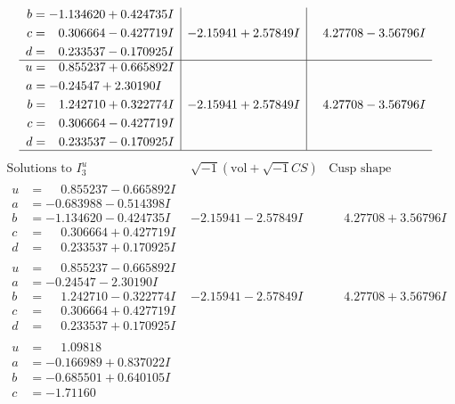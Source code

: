 \documentclass[1p]{elsarticle_modified}
\theoremstyle{definition}
\newcommand{\I}{\sqrt{-1}}
\begin{document}
$$\begin{array}{c|c|c}
\begin{aligned}
b &= -1.134620 + 0.424735 I \\
c &= \phantom{-}0.306664 - 0.427719 I \\
d &= \phantom{-}0.233537 - 0.170925 I\end{aligned}
 & -2.15941 + 2.57849 I & \phantom{-}4.27708 - 3.56796 I \\ \hline\begin{aligned}
u &= \phantom{-}0.855237 + 0.665892 I \\
a &= -0.24547 + 2.30190 I \\
b &= \phantom{-}1.242710 + 0.322774 I \\
c &= \phantom{-}0.306664 - 0.427719 I \\
d &= \phantom{-}0.233537 - 0.170925 I\end{aligned}
 & -2.15941 + 2.57849 I & \phantom{-}4.27708 - 3.56796 I\\
 \hline 
 \end{array}$$\newpage$$\begin{array}{c|c|c}  
\text{Solutions to }I^u_{3}& \I (\text{vol} + \sqrt{-1}CS) & \text{Cusp shape}\\
 \hline 
\begin{aligned}
u &= \phantom{-}0.855237 - 0.665892 I \\
a &= -0.683988 - 0.514398 I \\
b &= -1.134620 - 0.424735 I \\
c &= \phantom{-}0.306664 + 0.427719 I \\
d &= \phantom{-}0.233537 + 0.170925 I\end{aligned}
 & -2.15941 - 2.57849 I & \phantom{-}4.27708 + 3.56796 I \\ \hline\begin{aligned}
u &= \phantom{-}0.855237 - 0.665892 I \\
a &= -0.24547 - 2.30190 I \\
b &= \phantom{-}1.242710 - 0.322774 I \\
c &= \phantom{-}0.306664 + 0.427719 I \\
d &= \phantom{-}0.233537 + 0.170925 I\end{aligned}
 & -2.15941 - 2.57849 I & \phantom{-}4.27708 + 3.56796 I \\ \hline\begin{aligned}
u &= \phantom{-}1.09818\phantom{ +0.000000I} \\
a &= -0.166989 + 0.837022 I \\
b &= -0.685501 + 0.640105 I \\
c &= -1.71160\phantom{ +0.000000I} \\

\end{aligned}
\end{array}$$
\end{document}
